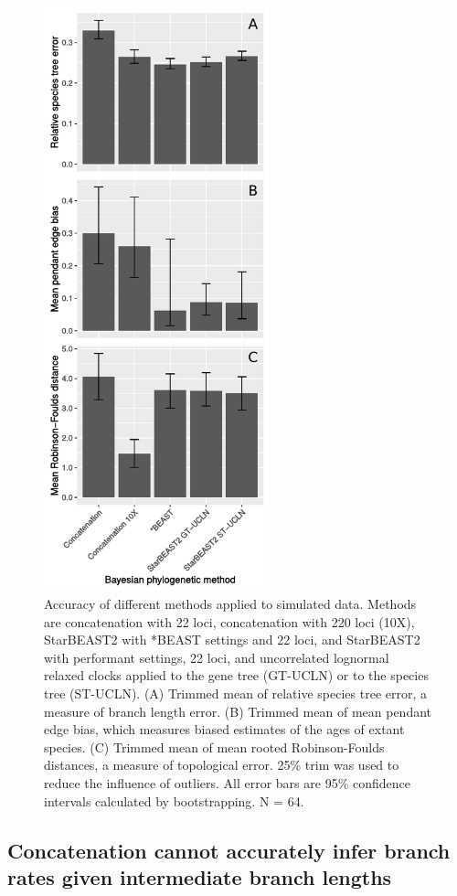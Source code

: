 \documentclass[12pt]{article}
\begin{document}
\begin{figure}[htb!]
\centering
\includegraphics[width=6.5cm]{tree_error.pdf}
\caption
{Accuracy of different methods applied to simulated data. Methods are concatenation with 22 loci, concatenation with 220 loci
(10X), StarBEAST2 with *BEAST settings and 22 loci, and StarBEAST2 with
performant settings, 22 loci, and uncorrelated lognormal relaxed clocks applied
to the gene tree (GT-UCLN) or to the species tree (ST-UCLN). (A) Trimmed mean of
relative species tree error, a measure of branch length error. (B) Trimmed
mean of mean pendant edge bias, which measures biased estimates of the ages of
extant species. (C) Trimmed mean of mean rooted Robinson-Foulds distances, a
measure of topological error. 25\% trim was used to reduce the
influence of outliers. All error bars are 95\% confidence intervals calculated
by bootstrapping. N = 64.}
\label{fig:speciesTreeError}
\end{figure}

\subsection{Concatenation cannot accurately infer branch rates given intermediate branch lengths}
\end{document}
